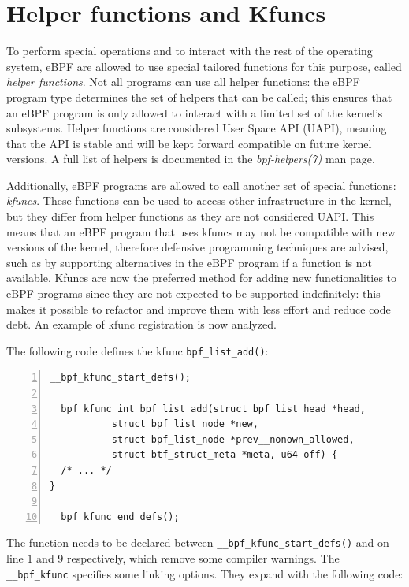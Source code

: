 \section{Helper functions and Kfuncs}

To perform special operations and to interact with the rest of the operating
system, eBPF are allowed to use special tailored functions for this purpose,
called \textit{helper functions}. Not all programs can use all helper functions:
the eBPF program type determines the set of helpers that can be called; this
ensures that an eBPF program is only allowed to interact with a limited set of
the kernel's subsystems. Helper functions are considered User Space API (UAPI),
meaning that the API is stable and will be kept forward compatible on future
kernel versions. A full list of helpers is documented in the
\textit{bpf-helpers(7)} man page.

Additionally, eBPF programs are allowed to call another set of special
functions: \textit{kfuncs}. These functions can be used to access other
infrastructure in the kernel, but they differ from helper functions as they are
not considered UAPI. This means that an eBPF program that uses kfuncs may not be
compatible with new versions of the kernel, therefore defensive programming
techniques are advised, such as by supporting alternatives in the eBPF program
if a function is not available. Kfuncs are now the preferred method for adding
new functionalities to eBPF programs since they are not expected to be supported
indefinitely: this makes it possible to refactor and improve them with less
effort and reduce code debt. An example of kfunc registration is now analyzed.

The following code defines the kfunc \verb|bpf_list_add()|:

\begin{Verbatim}[numbers=left, numbersep=5pt, frame=single]
__bpf_kfunc_start_defs();

__bpf_kfunc int bpf_list_add(struct bpf_list_head *head,
           struct bpf_list_node *new,
           struct bpf_list_node *prev__nonown_allowed,
           struct btf_struct_meta *meta, u64 off) {
  /* ... */
}

__bpf_kfunc_end_defs();
\end{Verbatim}

The function needs to be declared between \verb|__bpf_kfunc_start_defs()| and
 on line $1$ and $9$ respectively, which remove
some compiler warnings. The \verb|__bpf_kfunc| specifies some linking options.
They expand with the following code:



